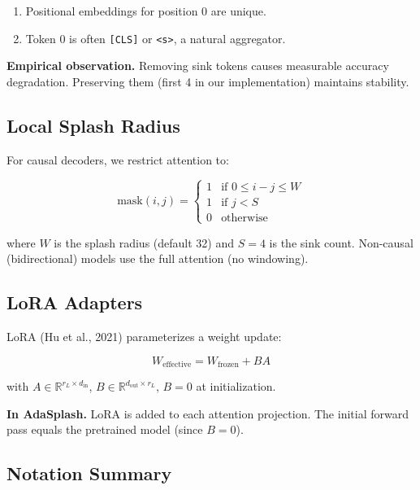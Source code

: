 \begin{enumerate}
\item Positional embeddings for position 0 are unique.
\item Token 0 is often \texttt{[CLS]} or \texttt{<s>}, a natural aggregator.

\end{enumerate}
\textbf{Empirical observation.} Removing sink tokens causes measurable accuracy 
degradation. Preserving them (first 4 in our implementation) maintains 
stability.

\subsection{Local Splash Radius}

For causal decoders, we restrict attention to:

\[
\text{mask}(i, j) = \begin{cases}
1 & \text{if } 0 \leq i - j \leq W \\
1 & \text{if } j < S \\
0 & \text{otherwise}
\end{cases}
\tag{3.8}
\]

where $W$ is the splash radius (default 32) and $S = 4$ is the sink count. 
Non-causal (bidirectional) models use the full attention (no windowing).

\subsection{LoRA Adapters}

LoRA (Hu et al., 2021) parameterizes a weight update:

\[
W_\text{effective} = W_\text{frozen} + B A
\tag{3.9}
\]

with $A \in \mathbb{R}^{r_L \times d_\text{in}}$, $B \in \mathbb{R}^{d_\text{out} \times r_L}$, 
$B = 0$ at initialization.

\textbf{In AdaSplash.} LoRA is added to each attention projection. The 
initial forward pass equals the pretrained model (since $B = 0$).

\subsection{Notation Summary}
